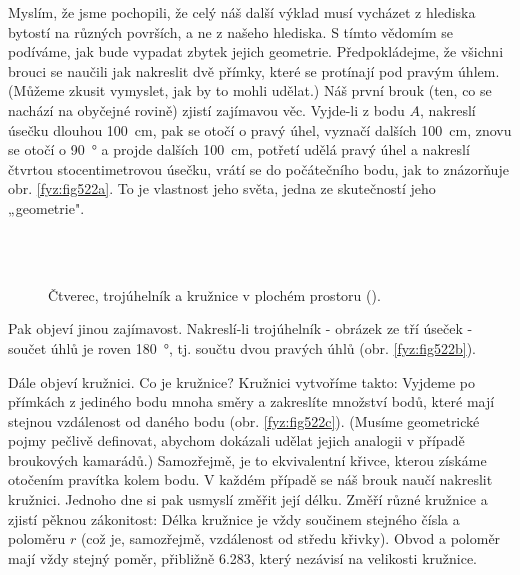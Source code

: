     Myslím, že jsme pochopili, že celý náš další výklad musí vycházet z hlediska bytostí na různých 
    površích, a ne z našeho hlediska. S tímto vědomím se podíváme, jak bude vypadat zbytek jejich 
    geometrie. Předpokládejme, že všichni brouci se naučili jak nakreslit dvě přímky, které se 
    protínají pod pravým úhlem. (Můžeme zkusit vymyslet, jak by to mohli udělat.) Náš první brouk 
    (ten, co se nachází na obyčejné rovině) zjistí zajímavou věc. Vyjde-li z bodu \(A\), nakreslí 
    úsečku dlouhou \SI{100}{\cm}, pak se otočí o pravý úhel, vyznačí dalších \SI{100}{\cm}, znovu 
    se otočí o \SI{90}{\degree} a projde dalších \SI{100}{\cm}, potřetí udělá pravý úhel a nakreslí 
    čtvrtou stocentimetrovou úsečku, vrátí se do počátečního bodu, jak to znázorňuje obr. 
    \ref{fyz:fig522a}. To je vlastnost jeho světa, jedna ze skutečností jeho „geometrie".
    
    \begin{figure}[ht!] %
      \centering  
          \\
          \\
      \caption{Čtverec, trojúhelník a kružnice v plochém prostoru (\cite[s.~777]{Feynman02}).}
      \label{fyz:fig522}
    \end{figure}     
    
    Pak objeví jinou zajímavost. Nakreslí-li trojúhelník - obrázek ze tří úseček - součet úhlů je 
    roven \SI{180}{\degree}, tj. součtu dvou pravých úhlů (obr. \ref{fyz:fig522b}).
    
    Dále objeví kružnici. Co je kružnice? Kružnici vytvoříme takto: Vyjdeme po přímkách z jediného 
    bodu mnoha směry a zakreslíte množství bodů, které mají stejnou vzdálenost od daného bodu (obr. 
    \ref{fyz:fig522c}). (Musíme geometrické pojmy pečlivě definovat, abychom dokázali udělat jejich 
    analogii v případě broukových kamarádů.) Samozřejmě, je to ekvivalentní křivce, kterou získáme 
    otočením pravítka kolem bodu. V každém případě se náš brouk naučí nakreslit kružnici. Jednoho 
    dne si pak usmyslí změřit její délku. Změří různé kružnice a zjistí pěknou zákonitost: Délka 
    kružnice je vždy součinem stejného čísla a poloměru \(r\) (což je, samozřejmě, vzdálenost od 
    středu křivky). Obvod a poloměr mají vždy stejný poměr, přibližně \num{6.283}, který nezávisí 
    na velikosti kružnice.

